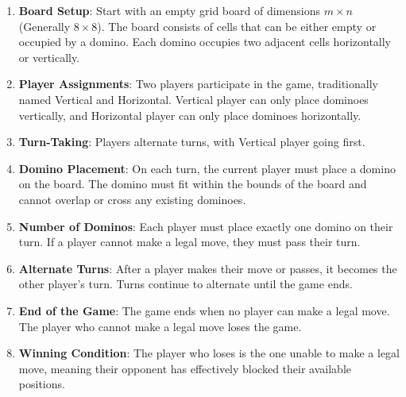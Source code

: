\documentclass[12pt,oneside]{book}
\begin{document}
\begin{enumerate}
    \item \textbf{Board Setup}: Start with an empty grid board of dimensions $m \times n$(Generally $8\times 8$). The board consists of cells that can be either empty or occupied by a domino. Each domino occupies two adjacent cells horizontally or vertically.
  
    \item \textbf{Player Assignments}: Two players participate in the game, traditionally named Vertical and Horizontal. Vertical player can only place dominoes vertically, and Horizontal player can only place dominoes horizontally.
  
    \item \textbf{Turn-Taking}: Players alternate turns, with Vertical player going first. 
  
    \item \textbf{Domino Placement}: On each turn, the current player must place a domino on the board. The domino must fit within the bounds of the board and cannot overlap or cross any existing dominoes.
  
    \item \textbf{Number of Dominos}: Each player must place exactly one domino on their turn. If a player cannot make a legal move, they must pass their turn.
  
    \item \textbf{Alternate Turns}: After a player makes their move or passes, it becomes the other player's turn. Turns continue to alternate until the game ends.
  
    \item \textbf{End of the Game}: The game ends when no player can make a legal move. The player who cannot make a legal move loses the game.
  
    \item \textbf{Winning Condition}: The player who loses is the one unable to make a legal move, meaning their opponent has effectively blocked their available positions.
  
  \end{enumerate}
\end{document}
